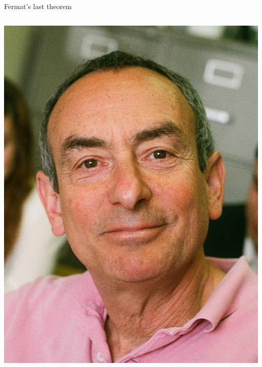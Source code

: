 \documentclass[10pt]{beamer}
\theoremstyle{definition}
\begin{document}
\begin{frame}[t]{Fermat's last theorem}
\begin{columns}[T]
\begin{column}{0.1\textwidth}
\begin{center}
\hspace{-1cm}
\includegraphics[width=1.5\textwidth]{ribet.jpg}
\end{center}
\end{column}

\end{columns}

\end{frame}
\end{document}

